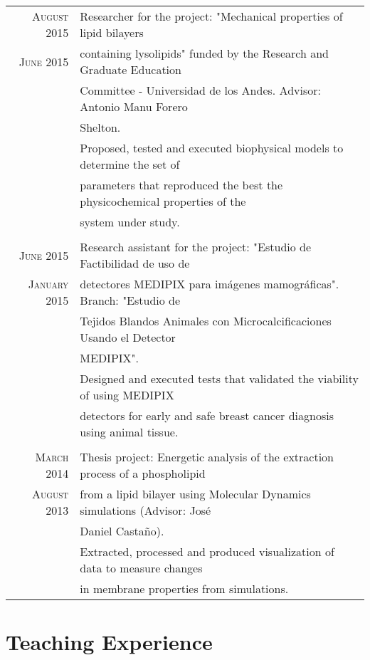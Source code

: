 \documentclass[a4paper,10pt]{article} %
\begin{document}
\begin{tabular}{rl}

\textsc{August 2015} & Researcher for the project: "Mechanical properties of lipid bilayers \\ 
\textsc{June 2015}   & containing lysolipids" funded by the Research and Graduate Education  \\ 
& Committee - Universidad de los Andes. Advisor: Antonio Manu Forero \\
& Shelton.  \\
& Proposed, tested and executed biophysical models to determine the set of \\ & parameters that reproduced the best the physicochemical properties of the \\& system under study. \\
\\ 
\textsc{June 2015} & Research assistant for the project: "Estudio de Factibilidad de uso de \\ 
\textsc{January 2015} & detectores MEDIPIX para imágenes mamográficas". Branch: "Estudio de \\ 
& Tejidos Blandos Animales con Microcalciﬁcaciones Usando el Detector \\
& MEDIPIX". \\
& Designed and executed tests that validated the viability of using MEDIPIX \\ & detectors for early and safe breast cancer diagnosis using animal tissue.  \\
\\
\textsc{March 2014} & Thesis project: Energetic analysis of the  extraction process of a phospholipid\\
\textsc{August 2013} & from a lipid bilayer using Molecular Dynamics simulations (Advisor: Jos\'e \\ & Daniel Casta\~no). \\
& Extracted, processed and produced visualization of data to measure changes \\ & in membrane properties from simulations.

\end{tabular}



\color{OrangeRed}
\section{Teaching Experience}
\color{black}
\end{document}
